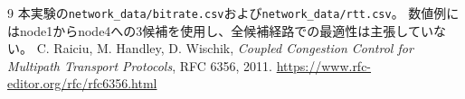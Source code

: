 \documentclass[a4paper,11pt]{article}
\begin{document}
\vspace{-5pt}
\begin{thebibliography}{9}
\small
{}
 本実験の\texttt{network\_data/bitrate.csv}および\texttt{network\_data/rtt.csv}。
 数値例にはnode1からnode4への3候補を使用し、全候補経路での最適性は主張していない。
 C. Raiciu, M. Handley, D. Wischik,
 \emph{Coupled Congestion Control for Multipath Transport Protocols}, RFC 6356, 2011.
 \url{https://www.rfc-editor.org/rfc/rfc6356.html}
\end{thebibliography}
\end{document}
